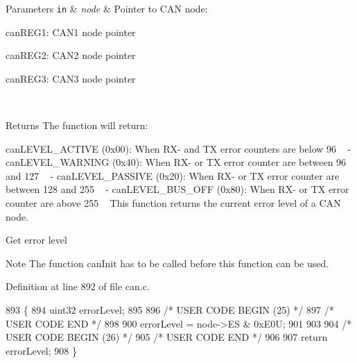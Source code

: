 \begin{DoxyParams}[1]{Parameters}
\mbox{\tt in}  & {\em node} & Pointer to C\+AN node\+:
\begin{DoxyItemize}
\item can\+R\+E\+G1\+: C\+A\+N1 node pointer
\item can\+R\+E\+G2\+: C\+A\+N2 node pointer
\item can\+R\+E\+G3\+: C\+A\+N3 node pointer 
\end{DoxyItemize}\\
\hline
\end{DoxyParams}
\begin{DoxyReturn}{Returns}
The function will return\+:
\begin{DoxyItemize}
\item can\+L\+E\+V\+E\+L\+\_\+\+A\+C\+T\+I\+VE (0x00)\+: When R\+X-\/ and TX error counters are below 96 ~\newline
 -\/ can\+L\+E\+V\+E\+L\+\_\+\+W\+A\+R\+N\+I\+NG (0x40)\+: When R\+X-\/ or TX error counter are between 96 and 127 ~\newline
 -\/ can\+L\+E\+V\+E\+L\+\_\+\+P\+A\+S\+S\+I\+VE (0x20)\+: When R\+X-\/ or TX error counter are between 128 and 255 ~\newline
 -\/ can\+L\+E\+V\+E\+L\+\_\+\+B\+U\+S\+\_\+\+O\+FF (0x80)\+: When R\+X-\/ or TX error counter are above 255 ~\newline
 This function returns the current error level of a C\+AN node. 
\end{DoxyItemize}
\end{DoxyReturn}

\begin{DoxyItemize}
\item Get error level ~\newline
 \begin{DoxyNote}{Note}
The function can\+Init has to be called before this function can be used. 
\end{DoxyNote}

\end{DoxyItemize}

Definition at line 892 of file can.\+c.


\begin{DoxyCode}
893 \{
894     uint32 errorLevel;
895 
896 \textcolor{comment}{/* USER CODE BEGIN (25) */}
897 \textcolor{comment}{/* USER CODE END */}
898 
900     errorLevel = node->ES & 0xE0U;
901 
903 
904 \textcolor{comment}{/* USER CODE BEGIN (26) */}
905 \textcolor{comment}{/* USER CODE END */}
906 
907     \textcolor{keywordflow}{return} errorLevel;
908 \}
\end{DoxyCode}
\mbox{\label{group__CAN_ga15061ba9ad17a032d93d482a63e5093a}} 
